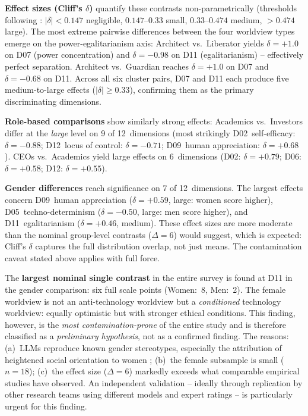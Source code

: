 \documentclass[12pt,a4paper]{article}
\begin{document}
\textbf{Effect sizes (Cliff's $\delta$)} quantify these contrasts non-parametrically (thresholds following \citealt{Romano2006}: $|\delta| < 0.147$ negligible, $0.147$--$0.33$ small, $0.33$--$0.474$ medium, $> 0.474$ large). The most extreme pairwise differences between the four worldview types emerge on the power-egalitarianism axis: Architect vs.\ Liberator yields $\delta = +1.0$ on D07 (power concentration) and $\delta = -0.98$ on D11 (egalitarianism) -- effectively perfect separation. Architect vs.\ Guardian reaches $\delta = +1.0$ on D07 and $\delta = -0.68$ on D11. Across all six cluster pairs, D07 and D11 each produce five medium-to-large effects ($|\delta| \geq 0.33$), confirming them as the primary discriminating dimensions.

\textbf{Role-based comparisons} show similarly strong effects: Academics vs.\ Investors differ at the \emph{large} level on 9 of 12~dimensions (most strikingly D02~self-efficacy: $\delta = -0.88$; D12~locus of control: $\delta = -0.71$; D09~human appreciation: $\delta = +0.68$). CEOs vs.\ Academics yield large effects on 6~dimensions (D02: $\delta = +0.79$; D06: $\delta = +0.58$; D12: $\delta = +0.55$).

\textbf{Gender differences} reach significance on 7 of 12~dimensions. The largest effects concern D09~human appreciation ($\delta = +0.59$, large: women score higher), D05~techno-determinism ($\delta = -0.50$, large: men score higher), and D11~egalitarianism ($\delta = +0.46$, medium). These effect sizes are more moderate than the nominal group-level contrasts ($\Delta = 6$) would suggest, which is expected: Cliff's $\delta$ captures the full distribution overlap, not just means. The contamination caveat stated above applies with full force.

The \textbf{largest nominal single contrast} in the entire survey is found at D11 in the gender comparison: six full scale points (Women:~8, Men:~2). The female worldview is not an anti-technology worldview but a \emph{conditioned} technology worldview: equally optimistic but with stronger ethical conditions. This finding, however, is the \emph{most contamination-prone} of the entire study and is therefore classified as a \emph{preliminary hypothesis}, not as a confirmed finding. The reasons: (a)~LLMs reproduce known gender stereotypes, especially the attribution of heightened social orientation to women \citep{Santurkar2023}; (b)~the female subsample is small ($n = 18$); (c)~the effect size ($\Delta = 6$) markedly exceeds what comparable empirical studies have observed. An independent validation -- ideally through replication by other research teams using different models and expert ratings -- is particularly urgent for this finding.
\end{document}
